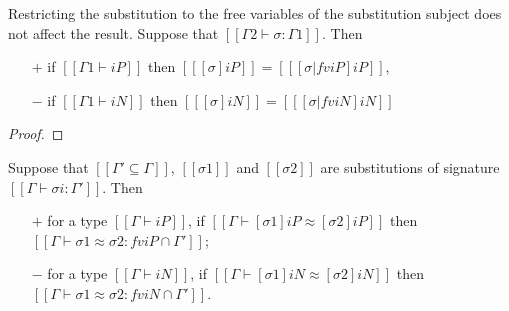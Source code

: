 \begin{lemma}
  \label{lemma:subst-restr-fv}
  Restricting the substitution to the free variables of the
  substitution subject does not affect the result.
  Suppose that $[[Γ2 ⊢ σ : Γ1]]$. Then
    \begin{itemize}
  \item[$+$] if $[[Γ1 ⊢ iP]]$ then $[[ [σ]iP ]] = [[ [σ|fv iP]iP ]]$,
  \item[$-$] if $[[Γ1 ⊢ iN]]$ then $[[ [σ]iN ]] = [[ [σ|fv iN]iN ]]$
  \end{itemize}
\end{lemma}
\begin{proof}
\end{proof}

\begin{lemma}[]
  Suppose that $[[{Γ'} ⊆ {Γ}]]$,
  $[[σ1]]$ and $[[σ2]]$ are substitutions of signature $[[Γ ⊢ σi : Γ']]$.
  Then 
  \begin{enumerate}
    \item [$+$] for a type $[[Γ ⊢ iP]]$, if $[[Γ ⊢ [σ1]iP ≈ [σ2]iP]]$ then 
    $[[Γ ⊢ σ1 ≈ σ2 : fv iP ∩ {Γ'}]]$;
    \item [$-$] for a type $[[Γ ⊢ iN]]$, if $[[Γ ⊢ [σ1]iN ≈ [σ2]iN]]$ then
    $[[Γ ⊢ σ1 ≈ σ2 : fv iN ∩ {Γ'}]]$.
  \end{enumerate}
\end{lemma}
